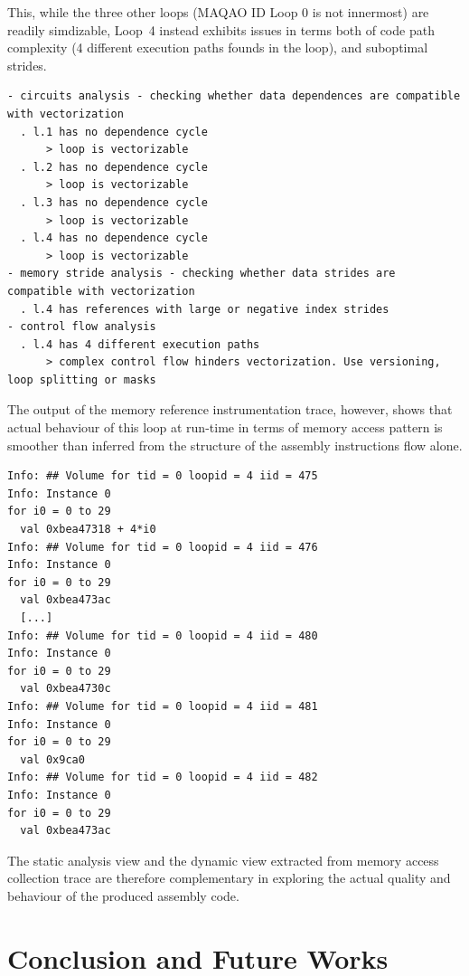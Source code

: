 \documentclass[11pt, a4paper, twoside]{montblanc2}
\begin{document}
This, while the three other loops (MAQAO ID Loop 0 is not innermost) are readily 
simdizable, Loop~4 instead exhibits issues in terms both of code path complexity 
(4 different execution paths founds in the loop), and suboptimal strides.

\begin{verbatim}
- circuits analysis - checking whether data dependences are compatible with vectorization
  . l.1 has no dependence cycle
      > loop is vectorizable
  . l.2 has no dependence cycle
      > loop is vectorizable
  . l.3 has no dependence cycle
      > loop is vectorizable
  . l.4 has no dependence cycle
      > loop is vectorizable
- memory stride analysis - checking whether data strides are compatible with vectorization
  . l.4 has references with large or negative index strides
- control flow analysis
  . l.4 has 4 different execution paths
      > complex control flow hinders vectorization. Use versioning, loop splitting or masks
\end{verbatim}

The output of the memory reference instrumentation trace, however, shows that 
actual behaviour of this loop at run-time in terms of memory access pattern is 
smoother than inferred from the structure of the assembly instructions flow alone.

\begin{small}
\begin{verbatim}
Info: ## Volume for tid = 0 loopid = 4 iid = 475
Info: Instance 0
for i0 = 0 to 29
  val 0xbea47318 + 4*i0
Info: ## Volume for tid = 0 loopid = 4 iid = 476
Info: Instance 0
for i0 = 0 to 29
  val 0xbea473ac
  [...]
Info: ## Volume for tid = 0 loopid = 4 iid = 480
Info: Instance 0
for i0 = 0 to 29
  val 0xbea4730c
Info: ## Volume for tid = 0 loopid = 4 iid = 481
Info: Instance 0
for i0 = 0 to 29
  val 0x9ca0
Info: ## Volume for tid = 0 loopid = 4 iid = 482
Info: Instance 0
for i0 = 0 to 29
  val 0xbea473ac
\end{verbatim}
\end{small}

The static analysis view and the dynamic view extracted from memory access 
collection trace are therefore complementary in exploring the actual quality and 
behaviour of the produced assembly code.


\section{Conclusion and Future Works}\label{sec:conclusion}
\end{document}
